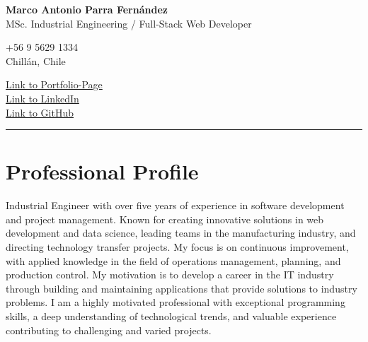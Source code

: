 \documentclass[a4paper,10pt]{article}
\newcommand{\mediumfont}{\fontsize{12pt}{14pt}\selectfont}
\begin{document}
	
	\pagestyle{fancy}


	
	\begin{center}
				\textbf{\LARGE Marco Antonio Parra Fernández} \\
			    {\mediumfont MSc. Industrial Engineering / Full-Stack Web Developer} \\

				\begin{minipage}[t]{0.45\textwidth}
					\small +56 9 5629 1334 \\
					\small Chillán, Chile \\
				\end{minipage}%
				\hfill
				\begin{minipage}[t]{0.45\textwidth}
					\raggedleft
        			\small \href{https://portfolio-mparraf.herokuapp.com}{Link to Portfolio-Page} \\
					\small \href{https://www.linkedin.com/in/marco-antonio-parra-82999337/}{Link to LinkedIn} \\
					\small \href{https://www.github.com/maaferna}{Link to GitHub}
				\end{minipage}
				\vspace{10pt} %
				\hrule
				\vspace{10pt} %

	\end{center}
	
	\section*{Professional Profile}
	\small
	Industrial Engineer with over five years of experience in software development and project management. Known for creating innovative solutions in web development and data science, leading teams in the manufacturing industry, and directing technology transfer projects. My focus is on continuous improvement, with applied knowledge in the field of operations management, planning, and production control. My motivation is to develop a career in the IT industry through building and maintaining applications that provide solutions to industry problems. I am a highly motivated professional with exceptional programming skills, a deep understanding of technological trends, and valuable experience contributing to challenging and varied projects.
\end{document}

